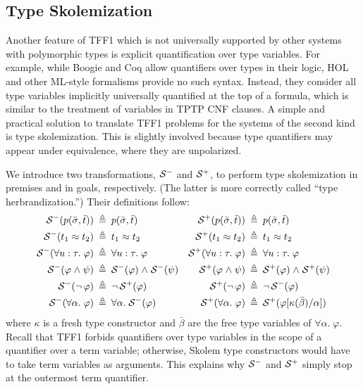 \subsection{Type Skolemization} \label{ssec:skol}

Another feature of TFF1 which is not universally supported
by other systems with polymorphic types is explicit
quantification over type variables.
For example, while Boogie and Coq \cite{xxx} allow quantifiers over types
in their logic,
%
HOL and other ML-style formalisms provide no such syntax.
Instead, they consider all type variables
implicitly universally quantified at the top of a formula, which is similar to
the treatment of variables in TPTP CNF clauses.
A simple and practical solution to translate TFF1 problems
for the systems of the second kind is type skolemization. This is slightly
involved because type quantifiers may appear under equivalence, where they are
unpolarized.

We introduce two transformations, $\mathcal{S}^-$ and $\mathcal{S}^+$, to perform type
skolemization in premises and in goals, respectively. (The latter is more
correctly called ``type herbrandization.'')
Their definitions follow:
\begin{align*}
\mathcal{S}^-(p(\bar{\sigma},\bar{t})) &\:\triangleq\: p(\bar{\sigma},\bar{t}) &
\mathcal{S}^+(p(\bar{\sigma},\bar{t})) &\:\triangleq\: p(\bar{\sigma},\bar{t}) \\
\mathcal{S}^-(t_1 \approx t_2) &\:\triangleq\: t_1 \approx t_2 &
\mathcal{S}^+(t_1 \approx t_2) &\:\triangleq\: t_1 \approx t_2 \\
\mathcal{S}^-(\forall u \mathrel{:} \tau .\; \varphi) &\:\triangleq\: \forall u \mathrel{:} \tau .\; \varphi &
\mathcal{S}^+(\forall u \mathrel{:} \tau .\; \varphi) &\:\triangleq\: \forall u \mathrel{:} \tau .\; \varphi \\
\mathcal{S}^-(\varphi \mathrel{\land} \psi) &\:\triangleq\: \mathcal{S}^-(\varphi) \mathrel{\land} \mathcal{S}^-(\psi) &
\mathcal{S}^+(\varphi \mathrel{\land} \psi) &\:\triangleq\: \mathcal{S}^+(\varphi) \mathrel{\land} \mathcal{S}^+(\psi) \\
\mathcal{S}^-(\lnot\, \varphi) &\:\triangleq\: \lnot\, \mathcal{S}^+(\varphi) &
\mathcal{S}^+(\lnot\, \varphi) &\:\triangleq\: \lnot\, \mathcal{S}^-(\varphi) \\
\mathcal{S}^-(\forall \alpha .\; \varphi) &\:\triangleq\: \forall \alpha .\; \mathcal{S}^-(\varphi) &
\mathcal{S}^+(\forall \alpha .\; \varphi) &\:\triangleq\:
\mathcal{S}^+(\varphi[\kappa(\bar\beta)/\alpha])
\end{align*}
where $\kappa$ is a fresh type constructor and $\bar\beta$ are
the free type variables of $\forall \alpha .\; \varphi$.
Recall that TFF1 forbids quantifiers over type variables in the scope
of a quantifier over a term variable; otherwise, Skolem type constructors
would have to take term variables as arguments. This explains why $\mathcal{S}^-$ and
$\mathcal{S}^+$ simply stop at the outermost term quantifier.

